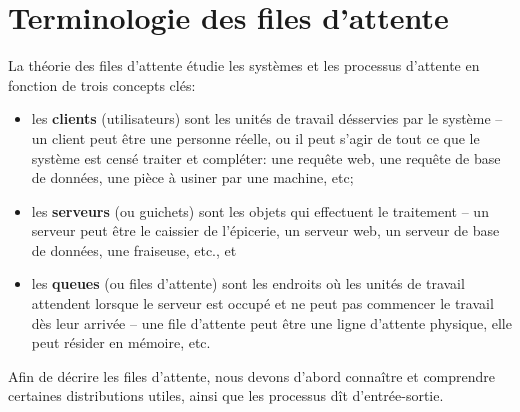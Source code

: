 \section{Terminologie des files d'attente}
La théorie des files d'attente étudie les systèmes et les processus d'attente en fonction de trois concepts clés:
\begin{itemize}
\item les \textbf{clients} (utilisateurs) sont les unités de travail désservies par le système -- un client peut être une personne réelle, ou il peut s'agir de tout ce que le système est censé traiter et compléter: une requête web, une requête de base de données, une pièce à usiner par une machine, etc;
\item les \textbf{serveurs} (ou guichets) sont les objets qui effectuent le traitement -- un serveur peut être le caissier de l'épicerie, un serveur web, un serveur de base de données, une fraiseuse, etc., et 
\item les \textbf{queues} (ou files d'attente) sont les endroits où les unités de travail attendent lorsque le serveur est occupé et ne peut pas commencer le travail dès leur arrivée -- une file d'attente peut être une ligne d'attente physique, elle peut résider en mémoire, etc. 
\end{itemize}
Afin de décrire les files d'attente, nous devons d'abord connaître et comprendre certaines distributions utiles, ainsi que les processus dît d'entrée-sortie.
